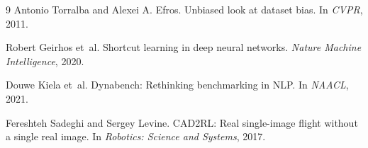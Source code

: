 \documentclass{article}
\begin{document}
\begin{thebibliography}{9}
Antonio Torralba and Alexei A. Efros.
\newblock Unbiased look at dataset bias.
\newblock In \emph{CVPR}, 2011.

Robert Geirhos et~al.
\newblock Shortcut learning in deep neural networks.
\newblock \emph{Nature Machine Intelligence}, 2020.

Douwe Kiela et~al.
\newblock Dynabench: Rethinking benchmarking in NLP.
\newblock In \emph{NAACL}, 2021.

Fereshteh Sadeghi and Sergey Levine.
\newblock CAD2RL: Real single-image flight without a single real image.
\newblock In \emph{Robotics: Science and Systems}, 2017.
\end{thebibliography}
\end{document}
